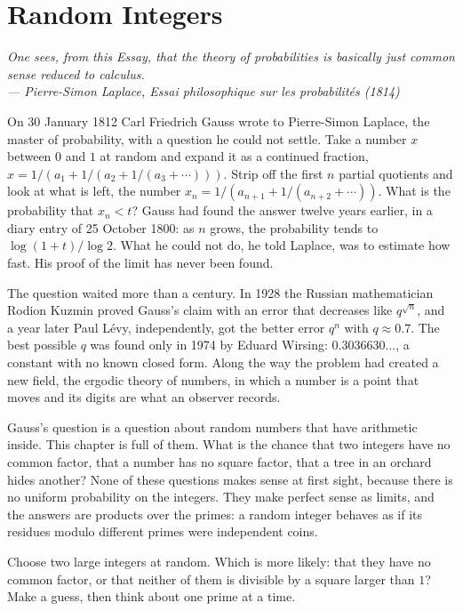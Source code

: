 \chapter{Random Integers}

\begin{center}\itshape
One sees, from this Essay, that the theory of probabilities is basically just common sense reduced to calculus.\\
\upshape --- Pierre-Simon Laplace, \emph{Essai philosophique sur les probabilités} (1814)
\end{center}

On 30 January 1812 Carl Friedrich Gauss wrote to Pierre-Simon Laplace, the master of probability, with a question he could not
settle. Take a number $x$ between $0$ and $1$ at random and expand it as a continued fraction,
$x=1/(a_1+1/(a_2+1/(a_3+\cdots)))$. Strip off the first $n$ partial quotients and look at what is left, the number
$x_n=1/(a_{n+1}+1/(a_{n+2}+\cdots))$. What is the probability that $x_n<t$? Gauss had found the answer twelve years earlier,
in a diary entry of 25 October 1800: as $n$ grows, the probability tends to $\log(1+t)/\log2$. What he could not do, he told
Laplace, was to estimate how fast. His proof of the limit has never been found.

The question waited more than a century. In 1928 the Russian mathematician Rodion Kuzmin proved Gauss's claim with an error
that decreases like $q^{\sqrt n}$, and a year later Paul Lévy, independently, got the better error $q^n$ with $q\approx0.7$. The
best possible $q$ was found only in 1974 by Eduard Wirsing: $0.3036630\ldots$, a constant with no known closed form. Along
the way the problem had created a new field, the ergodic theory of numbers, in which a number is a point that moves and its
digits are what an observer records.

Gauss's question is a question about random numbers that have arithmetic inside. This chapter is full of them. What is the
chance that two integers have no common factor, that a number has no square factor, that a tree in an orchard hides
another? None of these questions makes sense at first sight, because there is no uniform probability on the integers. They
make perfect sense as limits, and the answers are products over the primes: a random integer behaves as if its residues
modulo different primes were independent coins.

\begin{think}
Choose two large integers at random. Which is more likely: that they have no common factor, or that neither of them is
divisible by a square larger than $1$? Make a guess, then think about one prime at a time.
\end{think}

